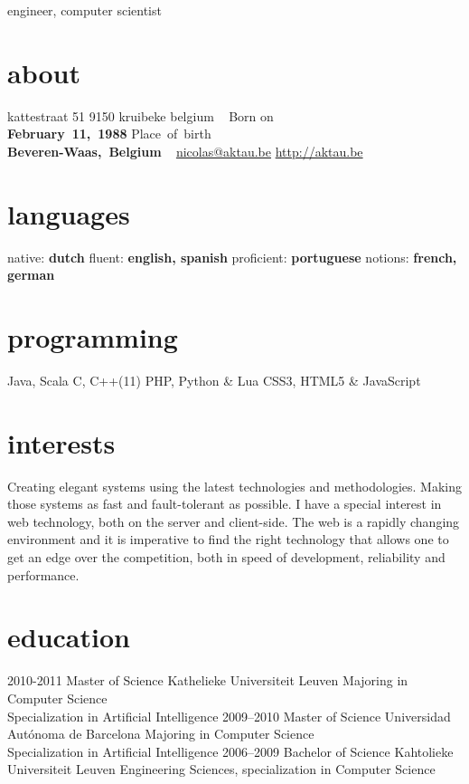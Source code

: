 \documentclass[]{friggeri-cv}
\begin{document}
       {engineer, computer scientist}


\begin{aside}
  \section{about}
    kattestraat 51
    9150 kruibeke
    belgium
    ~
    Born on\\\textbf{February~11,~1988}
    Place~of~birth\\\textbf{Beveren-Waas,~Belgium}
    ~
    \href{mailto:nicolas@aktau.be}{nicolas@aktau.be}
    \href{http://aktau.be}{http://aktau.be}
  \section{languages}
    native: \textbf{dutch}
    fluent: \textbf{english, spanish}
    proficient: \textbf{portuguese}
    notions: \textbf{french, german}
  \section{programming}
    Java, Scala
    C, C++(11)
    PHP, Python \& Lua
    CSS3, HTML5 \& JavaScript
\end{aside}

\section{interests}

Creating elegant systems using the latest technologies and methodologies. Making those systems as fast and fault-tolerant as possible.
I have a special interest in web technology, both on the server and client-side. The web is a rapidly changing environment and
it is imperative to find the right technology that allows one to get an edge over the competition, both in
speed of development, reliability and performance.

\section{education}

\begin{entrylist}
  \entry
    {2010-2011}
    {Master of Science}
    {Kathelieke Universiteit Leuven}
    {Majoring in Computer Science\\
    Specialization in Artificial Intelligence}
  \entry
    {2009–2010}
    {Master of Science}
    {Universidad Autónoma de Barcelona}
    {Majoring in Computer Science\\
    Specialization in Artificial Intelligence}
  \entry
    {2006–2009}
    {Bachelor of Science}
    {Kahtolieke Universiteit Leuven}
    {Engineering Sciences, specialization in Computer Science}
\end{entrylist}
\end{document}
